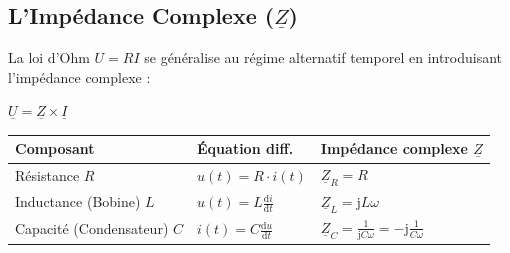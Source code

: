 \documentclass[11pt,a4paper]{article}
\newcommand{\jc}{\mathrm{j}} %
\newcommand{\cpx}[1]{\underline{#1}} %
\newcommand{\deriv}[2]{\frac{\mathrm{d}#1}{\mathrm{d}#2}} %
\begin{document}
\begin{center}
\end{center}

\subsection{L'Impédance Complexe ($\cpx{Z}$)}
La loi d'Ohm $U=RI$ se généralise au régime alternatif temporel en introduisant l'impédance complexe :
\begin{center}
    \Large $\cpx{U} = \cpx{Z} \times \cpx{I}$
\end{center}

\begin{center}
\renewcommand{\arraystretch}{1.5}
\begin{tabularx}{0.8\textwidth}{|>{\hsize=1.2\hsize}X|>{\hsize=0.8\hsize}X|>{\hsize=1\hsize}X|}
\hline
\rowcolor{uimmblue!20}
\textbf{Composant} & \textbf{Équation diff.} & \textbf{Impédance complexe $\cpx{Z}$} \\
\hline
Résistance $R$ & $u(t) = R \cdot i(t)$ & $\cpx{Z}_R = R$ \\
Inductance (Bobine) $L$ & $u(t) = L \deriv{i}{t}$ & $\cpx{Z}_L = \jc L\omega$ \\
Capacité (Condensateur) $C$ & $i(t) = C \deriv{u}{t}$ & $\cpx{Z}_C = \frac{1}{\jc C\omega} = -\jc \frac{1}{C\omega}$ \\
\hline
\end{tabularx}
\end{center}
\end{document}
